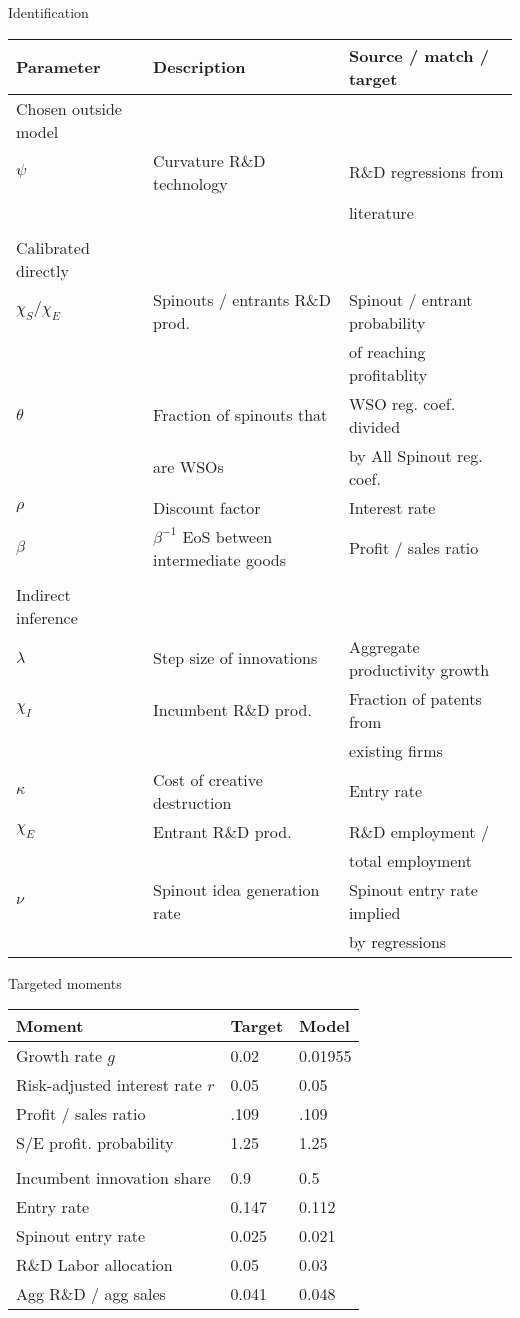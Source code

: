 \documentclass[english,usenames,dvipsnames]{beamer}
\begin{document}
\begin{frame}{Identification}
\begin{center}
	\tiny
	\begin{tabular}{lll}
		\hline 
		\textbf{Parameter} &  \textbf{Description} & \textbf{Source / match / target} \\
		\hline 
		Chosen outside model & \\
		$\psi$ & Curvature R\&D technology & R\&D regressions from \\
		& & literature\\
		& & \\
		Calibrated directly &  \\
		$\chi_S / \chi_E$ & Spinouts / entrants R\&D prod. & Spinout / entrant probability \\
		& & of reaching profitablity \\
		$\theta$ & Fraction of spinouts that & WSO reg. coef. divided \\
		& are WSOs & by All Spinout reg. coef. \\
		$\rho$ & Discount factor & Interest rate \\
		$\beta$ & $\beta^{-1}$ EoS between intermediate goods & Profit / sales ratio \\
		& \\
		Indirect inference & \\
		$\lambda$ & Step size of innovations & Aggregate productivity growth \\
		$\chi_I$ & Incumbent R\&D prod. & Fraction of patents from \\
		& & existing firms \\
		$\kappa$ & Cost of creative destruction & Entry rate \\
		$\chi_E$ & Entrant R\&D prod. & R\&D employment / \\
		& & total employment \\
		$\nu$ & Spinout idea generation rate & Spinout entry rate implied \\
		& & by regressions \\
		\hline
	\end{tabular}
\end{center}
\end{frame}

\begin{frame}{Targeted moments}
\begin{center}
	\small
	\begin{tabular}{lll}
		\hline 
		\textbf{Moment}  & \textbf{Target} & \textbf{Model }\tabularnewline
		\hline 
		Growth rate $g$ & 0.02 & 0.01955 \tabularnewline
		Risk-adjusted interest rate $r$ & 0.05 & 0.05 \tabularnewline
		Profit / sales ratio & .109 & .109 \tabularnewline
		S/E profit. probability & 1.25 & 1.25 \tabularnewline
		\tabularnewline
		Incumbent innovation share & 0.9 & 0.5
		\tabularnewline
		Entry rate & 0.147 & 0.112
		\tabularnewline
		Spinout entry rate & 0.025 & 0.021
		\tabularnewline
		R\&D Labor allocation & 0.05 & 0.03
		\tabularnewline
		Agg R\&D / agg sales & 0.041 & 0.048
	\end{tabular}
\end{center}
\end{frame}
\end{document}
